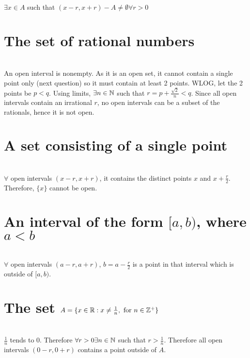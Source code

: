 
\begin{solution}
 $\exists x \in A$ such that $(x-r,x+r)-A \neq \emptyset \forall r > 0$
\end{solution}


\begin{parts}
 
 \part{The set of rational numbers}
 
 
\begin{solution}
 \\An open interval is nonempty. As it is an open set, it cannot contain a single point only (next question) so it must contain at least 2 points. WLOG, let the 2 points be $p < q$. Using limits, $\exists n \in \mathbb{N}$ such that $r = p + \frac{\sqrt{2}}{n} < q$. Since all open intervals contain an irrational $r$, no open intervals can be a subset of the rationals, hence it is not open.
\end{solution}

 \part{A set consisting of a single point}
 
 
\begin{solution}
 \\$\forall$ open intervals $(x-r,x+r)$, it contains the distinct points $x$ and $x+\frac{r}{2}$. Therefore, $\{x\}$ cannot be open.
\end{solution}

 \part{An interval of the form $[a,b)$, where $a < b$}
 
 
\begin{solution}
\\ $\forall$ open intervals $(a-r,a+r)$, $b=a-\frac{r}{2}$ is a point in that interval which is outside of $[a,b)$.
\end{solution}

 \part{The set $A = \{x\in\mathbb{R}:x\neq\frac{1}{n},\text{ for }n\in\mathbb{Z}^+\}$}
 
 
\begin{solution}
\\ $\frac{1}{n}$ tends to 0. Therefore $\forall r > 0 \exists n \in \mathbb{N}$ such that $r > \frac{1}{n}$. Therefore all open intervals $(0-r,0+r)$ contains a point outside of $A$.
\end{solution}
\end{parts}

